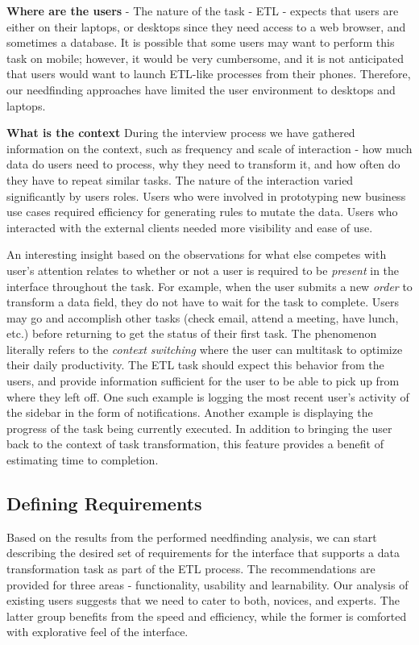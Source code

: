 \documentclass[12pt,letterpaper]{article}
\begin{document}
\textbf{Where are the users} - The nature of the task - ETL - expects that users are either on their laptops, or desktops since they need access to a web browser, and sometimes a database. It is possible that some users may want to perform this task on mobile; however, it would be very cumbersome, and it is not anticipated that users would want to launch ETL-like processes from their phones. Therefore, our needfinding approaches have limited the user environment to desktops and laptops. 

\textbf{What is the context} During the interview process we have gathered information on the context, such as frequency and scale of interaction - how much data do users need to process, why they need to transform it, and how often do they have to repeat similar tasks. The nature of the interaction varied significantly by users roles. Users who were involved in prototyping new business use cases required efficiency for generating rules to mutate the data. Users who interacted with the external clients needed more visibility and ease of use. 

An interesting insight based on the observations for what else competes with user's attention relates to whether or not a user is required to be \textit{present} in the interface throughout the task. For example, when the user submits a new \textit{order} to transform a data field, they do not have to wait for the task to complete. Users may go and accomplish other tasks (check email, attend a meeting, have lunch, etc.) before returning to get the status of their first task. The phenomenon literally refers to the \textit{context switching} where the user can multitask to optimize their daily productivity. The ETL task should expect this behavior from the users, and provide information sufficient for the user to be able to pick up from where they left off. One such example is logging the most recent user's activity of the sidebar in the form of notifications. Another example is displaying the progress of the task being currently executed. In addition to bringing the user back to the context of task transformation, this feature provides a benefit of estimating time to completion. 


\subsection*{Defining Requirements}

Based on the results from the performed needfinding analysis, we can start describing the desired set of requirements for the interface that supports a data transformation task as part of the ETL process. The recommendations are provided for three areas - functionality, usability and learnability. Our analysis of existing users suggests that we need to cater to both, novices, and experts. The latter group benefits from the speed and efficiency, while the former is comforted with explorative feel of the interface.
\end{document}
